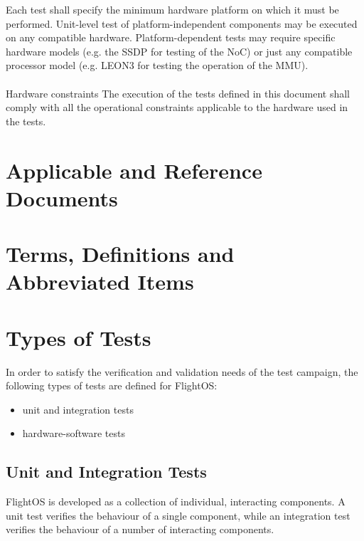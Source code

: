 Each test shall specify the minimum hardware platform on which it must be
performed. Unit-level test of platform-independent components may be executed
on any compatible hardware. Platform-dependent tests may require specific
hardware models (e.g. the \gls{SSDP} for testing of the \gls{NoC}) or just any
compatible processor model (e.g. \gls{LEON3} for testing the operation of the
\gls{MMU}).\\
\\

 {Hardware constraints}{%
The execution of the tests defined in this document shall comply with all %
the operational constraints applicable to the hardware used in the tests.%
}{}



\chapter{Applicable and Reference Documents} %

\printbibliography[heading=none]


\chapter{Terms, Definitions and Abbreviated Items}
\printglossary[type=acronym]
\printglossary[type=main, style=altlist]


\chapter{Types of Tests}

In order to satisfy the verification and validation needs of the test campaign,
the following types of tests are defined for FlightOS:
\begin{itemize}
	\item unit and integration tests
	\item hardware-software tests
\end{itemize}


\section {Unit and Integration Tests}

FlightOS is developed as a collection of individual, interacting components.
A unit test verifies the behaviour of a single component, while an integration
test verifies the behaviour of a number of interacting components. \\

